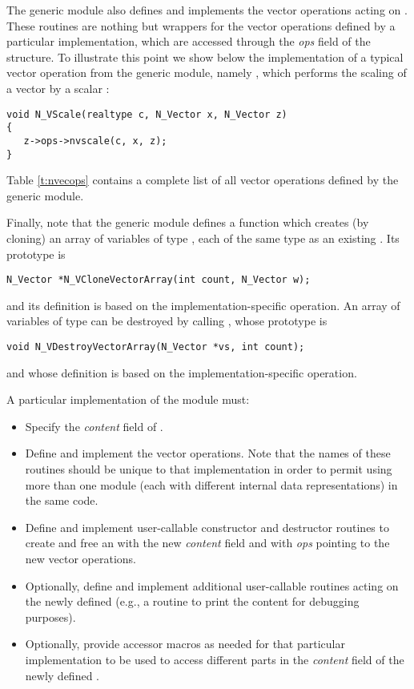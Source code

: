 The generic {\nvector} module also defines and implements the vector operations 
acting on .
These routines are nothing but wrappers for the vector operations defined by
a particular {\nvector} implementation, which are accessed through the {\em ops}
field of the  structure. To illustrate this point we
show below the implementation of a typical vector operation from the
generic {\nvector} module, namely , which performs the scaling of a
vector  by a scalar :
\begin{verbatim}
void N_VScale(realtype c, N_Vector x, N_Vector z) 
{
   z->ops->nvscale(c, x, z);
}
\end{verbatim}
Table \ref{t:nvecops} contains a complete list of all vector operations defined
by the generic {\nvector} module.



Finally, note that the generic {\nvector} module defines a function 
which creates (by cloning) an array of  variables of type , each of the 
same type as an existing . Its prototype is
\begin{verbatim}
N_Vector *N_VCloneVectorArray(int count, N_Vector w);
\end{verbatim}
and its definition is based on the implementation-specific  operation.
An array of variables of type  can be destroyed by calling ,
whose prototype is
\begin{verbatim}
void N_VDestroyVectorArray(N_Vector *vs, int count);
\end{verbatim}
and whose definition is based on the implementation-specific  operation.




A particular implementation of the {\nvector} module must:
\begin{itemize}
\item Specify the {\em content} field of .
\item Define and implement the vector operations. 
  Note that the names of these routines should be unique to that implementation in order 
  to permit using more than one {\nvector} module (each with different  
  internal data representations) in the same code.
\item Define and implement user-callable constructor and destructor
  routines to create and free an  with
  the new {\em content} field and with {\em ops} pointing to the
  new vector operations.
\item Optionally, define and implement additional user-callable routines
  acting on the newly defined  (e.g., a routine to print
  the content for debugging purposes).
\item Optionally, provide accessor macros as needed for that particular implementation to 
  be used to access different parts in the {\em content} field of the newly defined .
\end{itemize}



